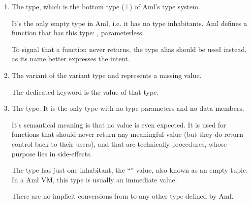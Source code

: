\begin{enumerate}
  \item The  type, which is the bottom type ($\bot$) of Aml's type system. 
  
  It's the only empty type in Aml, i.e. it has no type inhabitants. Aml defines a function that has this type: , parameterless. 
  
  To signal that a function never returns, the type alias  should be used instead, as its name better expresses the intent. 

  \item The  variant of the  variant type and represents a missing value.
  
  The dedicated keyword  is the value of that type. 
  
  \item The  type. It is the only  type with no type parameters and no data members. 
  
  It's semantical meaning is that no value is even expected. It is used for functions that should never return any meaningful value (but they do return control back to their users), and that are technically procedures, whose purpose lies in side-effects. 
  
  The type has just one inhabitant, the ``\code{()}'' value, also known as an empty tuple. In a Aml VM, this type is usually an immediate value.
  
  There are no implicit conversions from  to any other type defined by Aml. 
\end{enumerate}






